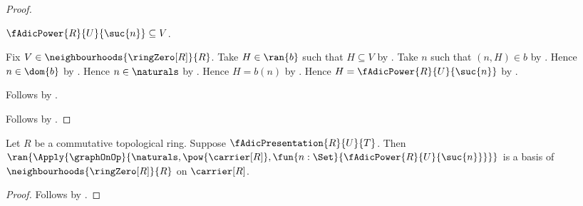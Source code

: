 \begin{proof}
\begin{subproof}
                $\fAdicPower{R}{U}{\suc{n}}\subseteq V$.
        \begin{subproof}
            Fix $V\in\neighbourhoods{\ringZero[R]}{R}$.
            Take $H\in\ran{b}$ such that $H\subseteq V$ by
                .
            Take $n$ such that $(n,H)\in b$ by .
            Hence $n\in\dom{b}$ by .
            Hence $n\in\naturals$ by .
            Hence $H=b(n)$ by .
            Hence $H=\fAdicPower{R}{U}{\suc{n}}$ by
                .
        \end{subproof}
        Follows by .
    \end{subproof}
    Follows by \auto.
\end{proof}

\begin{proposition}\label{f_adic_presentation_power_basis}
    Let $R$ be a commutative topological ring.
    Suppose $\fAdicPresentation{R}{U}{T}$.
    Then
        $\ran{\Apply{\graphOnOp}{
            \naturals,\pow{\carrier[R]},
            \fun{n:\Set}{\fAdicPower{R}{U}{\suc{n}}}}}$
            is a basis of $\neighbourhoods{\ringZero[R]}{R}$ on
                $\carrier[R]$.
\end{proposition}
\begin{proof}
    Follows by .
\end{proof}

